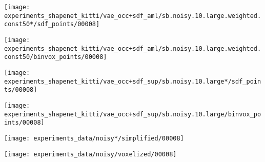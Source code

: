 \begin{minipage}[t]{0.1\textwidth}
    \vspace{0px}
    \centering
    \texttt{[image: experiments\_shapenet\_kitti/vae\_occ+sdf\_aml/sb.noisy.10.large.weighted.const50*/sdf\_points/00008]}
\end{minipage}
\begin{minipage}[t]{0.1\textwidth}
    \vspace{0px}
    \centering
    \texttt{[image: experiments\_shapenet\_kitti/vae\_occ+sdf\_aml/sb.noisy.10.large.weighted.const50/binvox\_points/00008]}
\end{minipage}
\begin{minipage}[t]{0.1\textwidth}
    \vspace{0px}
    \centering
    \texttt{[image: experiments\_shapenet\_kitti/vae\_occ+sdf\_sup/sb.noisy.10.large*/sdf\_points/00008]}
\end{minipage}
\begin{minipage}[t]{0.1\textwidth}
    \vspace{0px}
    \centering
    \texttt{[image: experiments\_shapenet\_kitti/vae\_occ+sdf\_sup/sb.noisy.10.large/binvox\_points/00008]}
\end{minipage}
\begin{minipage}[t]{0.1\textwidth}
    \vspace{0px}
    \centering
    \texttt{[image: experiments\_data/noisy*/simplified/00008]}
\end{minipage}
\begin{minipage}[t]{0.1\textwidth}
    \vspace{0px}
    \centering
    \texttt{[image: experiments\_data/noisy/voxelized/00008]}
\end{minipage}\\
\begin{minipage}[t]{0.02\textwidth}
    \vspace{0px}
\end{minipage}
